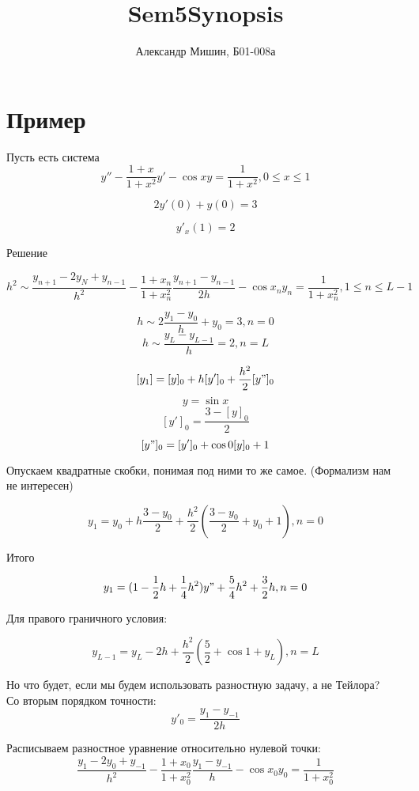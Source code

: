 \documentclass[a4paper,12pt]{article}
\title{Sem5Synopsis}
\begin{document}
\author{Александр Мишин, Б01-008а}
\date{}
\maketitle

\section*{Пример}
Пусть есть система \\

\[y'' - \frac{1 + x}{1 + x^2}y' - \cos{x} y = \frac{1}{1 + x^2} , 0 \leq x \leq 1\]

\[2 y'(0) + y(0) = 3\]

\[y'_x(1) = 2\]

Решение

\[h^2 \sim  \frac{y_{n+1} - 2y_N + y_{n-1}} {h^2} - \frac{1 + x_n}{1 + x_n^2} \frac{y_{n+1} - y_{n-1}}{2h} - \cos{x_n y_n} = \frac{1}{1 + x_n^2}, 1 \leq n \leq L - 1\]

\[h \sim 2 \frac{y_1 - y_0}{h} + y_0 = 3, n = 0\]
\[h \sim \frac{y_L - y_{L-1}}{h} = 2, n = L\]

\[[y_1] = [y]_0 + h [y']_0 + \frac{h^2}{2} [y"]_0\]
\[y = \sin{x}\]
\[[y']_0 = \frac{3 - [y]_0}{2}\]
\[[y"]_0 = [y']_0 + \cos{0} [y]_0 + 1\]

Опускаем квадратные скобки, понимая под ними то же самое. (Формализм нам не интересен)

\[y_1 = y_0 + h\frac{3 - y_0}{2} + \frac{h^2}{2} (\frac{3 - y_0}{2} + y_0 + 1), n = 0\]

Итого

\[y_1 = (1 - \frac{1}{2}h + \frac{1}{4}h^2) y" + \frac{5}{4}h^2 + \frac{3}{2}h, n = 0\]

Для правого граничного условия:

\[y_{L-1} = y_L - 2h + \frac{h^2}{2} (\frac{5}{2} + \cos{1} + y_L), n = L\]


Но что будет, если мы будем использовать разностную задачу, а не Тейлора?\\

Со вторым порядком точности:\\

\[y'_0 = \frac{y_1 - y_{-1}}{2h}\]

Расписываем разностное уравнение относительно нулевой точки:\\

\[\frac{y_1 - 2y_0 + y_{-1}}{h^2} - \frac{1 + x_0}{1 + x_0^2} \frac{y_1 - y_{-1}}{h} - \cos{x_0}y_0 = \frac{1}{1 + x_0^2}\]
\end{document}
